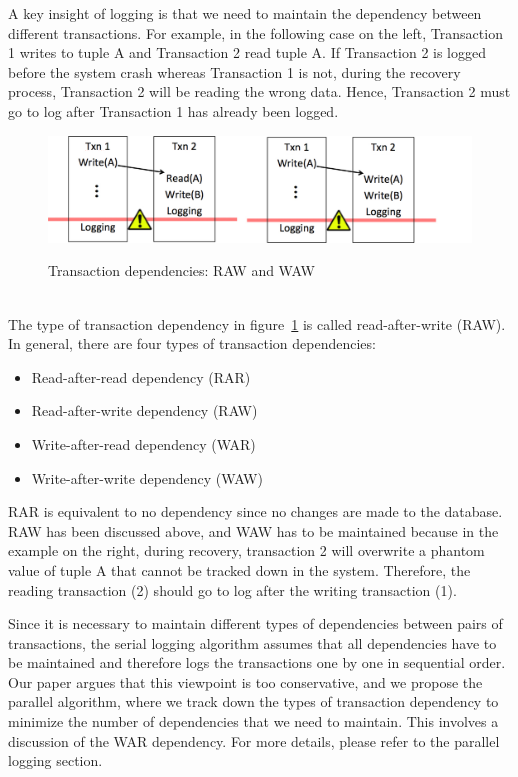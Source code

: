 A key insight of logging is that we need to maintain the dependency between different transactions. For example, in the following case on the left, Transaction 1 writes to tuple A and Transaction 2 read tuple A. If Transaction 2 is logged before the system crash whereas Transaction 1 is not, during the recovery process, Transaction 2 will be reading the wrong data. Hence, Transaction 2 must go to log after Transaction 1 has already been logged. 
\begin{figure}[!h]
\caption{Transaction dependencies: RAW and WAW}
\includegraphics[width=\textwidth]{DepExample.jpeg}
\label{depExample}
\end{figure}\\
The type of transaction dependency in figure~\ref{depExample} is called read-after-write (RAW). In general, there are four types of transaction dependencies:
\begin{itemize}
\item Read-after-read dependency (RAR)
\item Read-after-write dependency (RAW)
\item Write-after-read dependency (WAR)
\item Write-after-write dependency (WAW)
\end{itemize}
RAR is equivalent to no dependency since no changes are made to the database. RAW has been discussed above, and WAW has to be maintained because in the example on the right, during recovery, transaction 2 will overwrite a phantom value of tuple A that cannot be tracked down in the system. Therefore, the reading transaction (2) should go to log after the writing transaction (1).\par
Since it is necessary to maintain different types of dependencies between pairs of transactions, the serial logging algorithm assumes that all dependencies have to be maintained and therefore logs the transactions one by one in sequential order. Our paper argues that this viewpoint is too conservative, and we propose the parallel algorithm, where we track down the types of transaction dependency to minimize the number of dependencies that we need to maintain. This involves a discussion of the WAR dependency. For more details, please refer to the parallel logging section. \par

